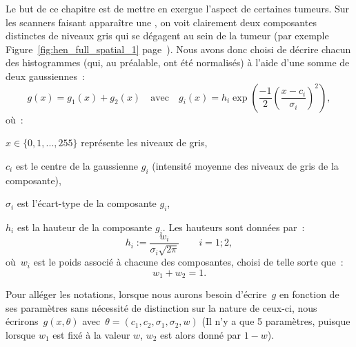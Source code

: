 \documentclass[main.tex]{subfiles}
\begin{document}
Le but de ce chapitre est de mettre en exergue l'aspect \heterogene de certaines tumeurs. Sur les scanners %
faisant apparaître une \hetero, 
on voit clairement deux composantes distinctes de niveaux gris qui se dégagent au sein de la tumeur (\cf par exemple Figure~\ref{fig:hen_full_spatial_1} page~\pageref{fig:hen_full_spatial_1}). Nous avons donc choisi de décrire chacun des histogrammes (qui, au préalable, ont été normalisés) à l'aide d'une somme de deux gaussiennes~:
\begin{equation}
\label{eq:decomp_gaussienne}
g(x) = g_1(x)+g_2(x) \quad \textrm{avec} \quad g_i(x) = h_i\exp \left(\frac{-1}{2} \left( \dfrac{x-c_i}{\sigma_i}\right)^2  \right),
\end{equation}
où~:
\begin{myitemize}
\item $x\in\{ 0,1, ..., 255\}$ représente les niveaux de gris,
\item $c_i$ est le centre de la gaussienne $g_i$ (\ie intensité moyenne des niveaux de gris de la composante),
\item $\sigma_i$ est l'écart-type de la composante $g_i$,
\item $h_i$ est la hauteur de la composante $g_i$. Les hauteurs sont données par~:
\begin{equation}
\label{eq:hauteur_gaussienne}
h_i := \dfrac{w_i}{\sigma_i \sqrt{2\pi}} \qquad i=1;2,
\end{equation}
où~$w_i$ est le poids associé à chacune des composantes, choisi de telle sorte que~:
\begin{equation}
w_1+w_2=1.
\end{equation}
\end{myitemize}

Pour alléger les notations, lorsque nous aurons besoin d'écrire~$g$ en fonction de ses paramètres sans nécessité de distinction sur la nature de ceux-ci, nous  écrirons~$g(x,\theta)$ avec~$\theta =( c_1,c_2,\sigma_1,\sigma_2,w  )$ (Il n'y a que 5 paramètres, puisque lorsque $w_1$ est fixé à la valeur $w$, $w_2$ est alors donné par $1-w$).
\end{document}
